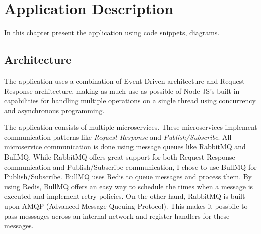 
\chapter{Application Description}

In this chapter present the application using code snippets, diagrams.

\section{Architecture}

The application uses a combination of Event Driven architecture and Request-Response architecture, making as much use as possible of Node JS's built in capabilities for handling multiple operations on a single thread using concurrency and asynchronous programming.

The application consists of multiple microservices. These microservices implement communication patterns like \textit{Request-Response} and \textit{Publish/Subscribe}. All microservice communication is done using message queues like RabbitMQ and BullMQ. While RabbitMQ offers great support for both Request-Response communication and Publish/Subscribe communication, I chose to use BullMQ for Publish/Subscribe. BullMQ uses Redis to queue messages and process them. By using Redis, BullMQ offers an easy way to schedule the times when a message is executed and implement retry policies. On the other hand, RabbitMQ is built upon AMQP (Advanced Message Queuing Protocol). This makes it possbile to pass messsages across an internal network and register handlers for these messages. 

